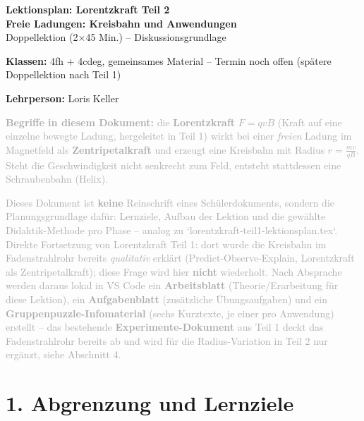 \documentclass[11pt,a4paper]{article}
\begin{document}
\sloppy

\begin{center}
{\Huge\bfseries\color{titleblue}Lektionsplan: Lorentzkraft Teil 2}\\[0.2em]
{\Large\bfseries\color{titleblue}Freie Ladungen: Kreisbahn und Anwendungen}\\[0.4em]
{\large Doppellektion (2$\times$45 Min.) -- Diskussionsgrundlage}
\end{center}
\vspace{0.5em}

\noindent\textbf{Klassen:} 4fh + 4cdeg, gemeinsames Material -- Termin noch offen (spätere Doppellektion nach Teil 1)

\noindent\textbf{Lehrperson:} Loris Keller

\vspace{0.3em}
\noindent\textcolor{darkgray}{\textbf{Begriffe in diesem Dokument:} die
\textbf{Lorentzkraft} $F=qvB$ (Kraft auf eine einzelne bewegte Ladung,
hergeleitet in Teil 1) wirkt bei einer \emph{freien} Ladung im Magnetfeld
als \textbf{Zentripetalkraft} und erzeugt eine Kreisbahn mit Radius
$r=\frac{mv}{qB}$. Steht die Geschwindigkeit nicht senkrecht zum Feld,
entsteht stattdessen eine Schraubenbahn (Helix).}

\vspace{0.3em}
\noindent\textcolor{darkgray}{Dieses Dokument ist \textbf{keine}
Reinschrift eines Schülerdokuments, sondern die Planungsgrundlage dafür:
Lernziele, Aufbau der Lektion und die gewählte Didaktik-Methode pro
Phase -- analog zu `lorentzkraft-teil1-lektionsplan.tex`. Direkte
Fortsetzung von Lorentzkraft Teil 1: dort wurde die Kreisbahn im
Fadenstrahlrohr bereits \emph{qualitativ} erklärt (Predict-Observe-Explain,
Lorentzkraft als Zentripetalkraft); diese Frage wird hier \textbf{nicht}
wiederholt. Nach Absprache werden daraus lokal in VS Code ein
\textbf{Arbeitsblatt} (Theorie/Erarbeitung für diese Lektion), ein
\textbf{Aufgabenblatt} (zusätzliche Übungsaufgaben) und ein
\textbf{Gruppenpuzzle-Infomaterial} (sechs Kurztexte, je einer pro
Anwendung) erstellt -- das bestehende \textbf{Experimente-Dokument} aus
Teil 1 deckt das Fadenstrahlrohr bereits ab und wird für die
Radius-Variation in Teil 2 nur ergänzt, siehe Abschnitt 4.}

\section*{1. Abgrenzung und Lernziele}
\end{document}
